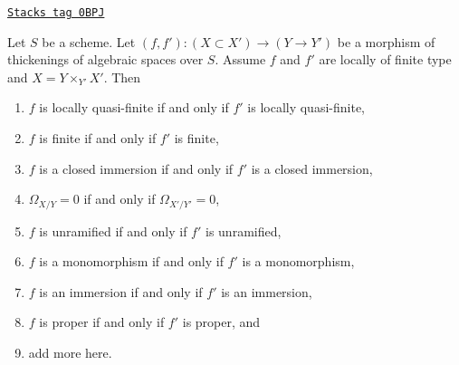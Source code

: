 \begin{lemma}
\label{spaces-more-morphisms-lemma-properties-that-extend-over-thickenings}
\href{https://stacks.math.columbia.edu/tag/0BPJ}{\texttt{Stacks tag 0BPJ}}

Let $S$ be a scheme. Let $(f, f') : (X \subset X') \to (Y \to Y')$ be a
morphism of thickenings of algebraic spaces over $S$. Assume $f$ and $f'$
are locally of finite type and $X = Y \times_{Y'} X'$. Then
\begin{enumerate}
\item $f$ is locally quasi-finite if and only if $f'$ is locally quasi-finite,
\item $f$ is finite if and only if $f'$ is finite,
\item $f$ is a closed immersion if and only if $f'$ is a closed immersion,
\item $\Omega_{X/Y} = 0$ if and only if $\Omega_{X'/Y'} = 0$,
\item $f$ is unramified if and only if $f'$ is unramified,
\item $f$ is a monomorphism if and only if $f'$ is a monomorphism,
\item $f$ is an immersion if and only if $f'$ is an immersion,
\item $f$ is proper if and only if $f'$ is proper, and
\item add more here.
\end{enumerate}
\end{lemma}

